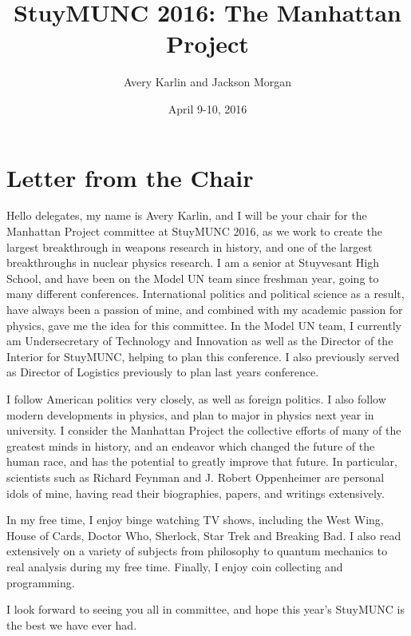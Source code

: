 \documentclass[11 pt, twoside]{article}
\begin{document}
\title{StuyMUNC 2016: The Manhattan Project}
\author{Avery Karlin and Jackson Morgan}
\date{April 9-10, 2016}

\maketitle
\newpage
\tableofcontents
\vspace{11pt}
\newpage

\section{Letter from the Chair}
Hello delegates, my name is Avery Karlin, and I will be your chair for the Manhattan Project committee at StuyMUNC 2016, as we work to create the largest breakthrough in weapons research in history, and one of the largest breakthroughs in nuclear physics research. I am a senior at Stuyvesant High School, and have been on the Model UN team since freshman year, going to many different conferences. International politics and political science as a result, have always been a passion of mine, and combined with my academic passion for physics, gave me the idea for this committee. In the Model UN team, I currently am Undersecretary of Technology and Innovation as well as the Director of the Interior for StuyMUNC, helping to plan this conference. I also previously served as Director of Logistics previously to plan last years conference.

I follow American politics very closely, as well as foreign politics. I also follow modern developments in physics, and plan to major in physics next year in university. I consider the Manhattan Project the collective efforts of many of the greatest minds in history, and an endeavor which changed the future of the human race, and has the potential to greatly improve that future. In particular, scientists such as Richard Feynman and J. Robert Oppenheimer are personal idols of mine, having read their biographies, papers, and writings extensively.

In my free time, I enjoy binge watching TV shows, including the West Wing, House of Cards, Doctor Who, Sherlock, Star Trek and Breaking Bad. I also read extensively on a variety of subjects from philosophy to quantum mechanics to real analysis during my free time. Finally, I enjoy coin collecting and programming.

I look forward to seeing you all in committee, and hope this year's StuyMUNC is the best we have ever had.
\end{document}
